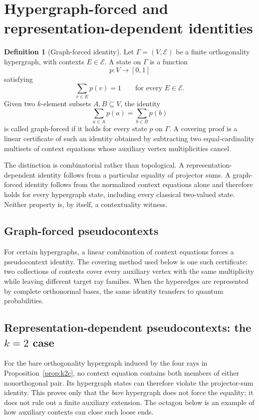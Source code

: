 \documentclass[
  twocolumn,
  aps,
  pra,
  floatfix,
  amsmath,amssymb,
  longbibliography
]{revtex4-2}
\theoremstyle{definition}
\newtheorem{definition}[theorem]{Definition}
\theoremstyle{remark}
\begin{document}
\section{Hypergraph-forced and representation-dependent identities}
\label{sec:loose_ends}

\begin{definition}[Graph-forced identity]
Let \(\Gamma=(V,\mathcal E)\) be a finite orthogonality hypergraph, with contexts \(E\in\mathcal E\). A state on \(\Gamma\) is a function
\[
p:V\to[0,1]
\]
satisfying
\[
\sum_{v\in E}p(v)=1
\qquad
\text{for every }E\in\mathcal E.
\]
Given two \(k\)-element subsets \(A,B\subseteq V\), the identity
\[
\sum_{a\in A}p(a)=\sum_{b\in B}p(b)
\]
is called graph-forced if it holds for every state \(p\) on \(\Gamma\). A covering proof is a linear certificate of such an identity obtained by subtracting two equal-cardinality multisets of context equations whose auxiliary vertex multiplicities cancel.
\end{definition}

The distinction is combinatorial rather than topological.  A
representation-dependent identity follows from a particular equality of
projector sums.  A graph-forced identity follows from the normalized
context equations alone and therefore holds for every hypergraph state,
including every classical two-valued state.  Neither property is, by
itself, a contextuality witness.

\subsection{Graph-forced pseudocontexts}

For certain hypergraphs, a linear combination of context equations forces
a pseudocontext identity.  The covering method used below is one such
certificate: two collections of contexts cover every auxiliary vertex
with the same multiplicity while leaving different target ray families.
When the hyperedges are represented by complete orthonormal bases, the
same identity transfers to quantum probabilities.

\subsection{Representation-dependent pseudocontexts: the \texorpdfstring{$k=2$}{k=2} case}

For the bare orthogonality hypergraph induced by the four rays in
Proposition~\ref{prop:k2c}, no context equation contains both members of
either nonorthogonal pair.  Its hypergraph states can therefore violate
the projector-sum identity.  This proves only that the \emph{bare}
hypergraph does not force the equality; it does not rule out a finite
auxiliary extension.  The octagon below is an example of how auxiliary
contexts can close such loose ends.
\end{document}
